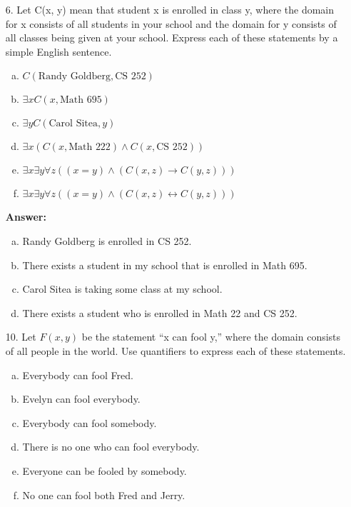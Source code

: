 \begin{itemize}
    \item[6.] Let C(x, y) mean that student x is enrolled in class y,
          where the domain for x consists of all students in your school and
          the domain for y consists of all classes being given at your school.
          Express each of these statements by a simple English sentence.
          \begin{enumerate}[a.]
              \item $C(\text{Randy Goldberg}, \text{CS } 252)$
              \item $\exists xC(x, \text{Math } 695)$
              \item $\exists yC(\text{Carol Sitea}, y)$
              \item $\exists x(C(x, \text{Math } 222) \land C(x, \text{CS } 252))$
              \item $\exists x \exists y \forall z ((x = y) \land (C(x, z) \to C(y, z)))$
              \item $\exists x \exists y \forall z ((x = y) \land (C(x, z) \leftrightarrow C(y, z)))$
          \end{enumerate}
          \textbf{Answer:}
          \begin{enumerate}[a.]
              \item Randy Goldberg is enrolled in CS 252.
              \item There exists a student in my school that is enrolled in Math 695.
              \item Carol Sitea is taking some class at my school.
              \item There exists a student who is enrolled in Math 22 and CS 252.
          \end{enumerate}
    \item[10.] Let $F(x, y)$ be the statement “x can fool y,” where the domain consists of
          all people in the world. Use quantifiers to express each of these statements.
          \begin{enumerate}[a.]
              \item Everybody can fool Fred.
              \item Evelyn can fool everybody.
              \item Everybody can fool somebody.
              \item There is no one who can fool everybody.
              \item Everyone can be fooled by somebody.
              \item No one can fool both Fred and Jerry.

\end{enumerate}
\end{itemize}
